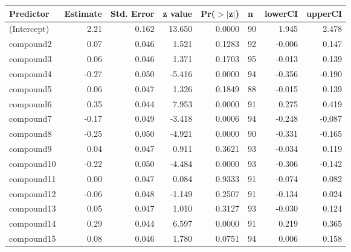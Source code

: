 \begin{table}[ht]
\centering
\begin{tabular}{lrrrrlrr}
  \hline
Predictor & Estimate & Std. Error & z value & Pr($>$$|$z$|$) & n & lowerCI & upperCI \\ 
  \hline
(Intercept) & 2.21 & 0.162 & 13.650 & 0.0000 & 90 & 1.945 & 2.478 \\ 
  compound2 & 0.07 & 0.046 & 1.521 & 0.1283 & 92 & -0.006 & 0.147 \\ 
  compound3 & 0.06 & 0.046 & 1.371 & 0.1703 & 95 & -0.013 & 0.139 \\ 
  compound4 & -0.27 & 0.050 & -5.416 & 0.0000 & 94 & -0.356 & -0.190 \\ 
  compound5 & 0.06 & 0.047 & 1.326 & 0.1849 & 88 & -0.015 & 0.139 \\ 
  compound6 & 0.35 & 0.044 & 7.953 & 0.0000 & 91 & 0.275 & 0.419 \\ 
  compound7 & -0.17 & 0.049 & -3.418 & 0.0006 & 94 & -0.248 & -0.087 \\ 
  compound8 & -0.25 & 0.050 & -4.921 & 0.0000 & 90 & -0.331 & -0.165 \\ 
  compound9 & 0.04 & 0.047 & 0.911 & 0.3621 & 93 & -0.034 & 0.119 \\ 
  compound10 & -0.22 & 0.050 & -4.484 & 0.0000 & 93 & -0.306 & -0.142 \\ 
  compound11 & 0.00 & 0.047 & 0.084 & 0.9333 & 91 & -0.074 & 0.082 \\ 
  compound12 & -0.06 & 0.048 & -1.149 & 0.2507 & 91 & -0.134 & 0.024 \\ 
  compound13 & 0.05 & 0.047 & 1.010 & 0.3127 & 93 & -0.030 & 0.124 \\ 
  compound14 & 0.29 & 0.044 & 6.597 & 0.0000 & 91 & 0.219 & 0.365 \\ 
  compound15 & 0.08 & 0.046 & 1.780 & 0.0751 & 94 & 0.006 & 0.158 \\ 
   \hline
\end{tabular}
\end{table}
